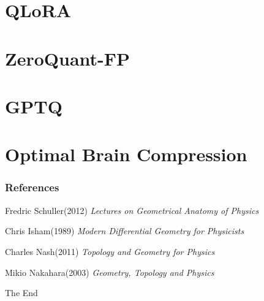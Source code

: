 \documentclass{beamer}
\theoremstyle{plain}
\theoremstyle{definition}
\theoremstyle{remark}
\numberwithin{equation}{section}
\numberwithin{figure}{section}
\numberwithin{theorem}{section}
\begin{document}
\section{QLoRA}
\section{ZeroQuant-FP}
\section{GPTQ}
\section{Optimal Brain Compression}



\begin{frame}
\frametitle{References}
\footnotesize{
\begin{thebibliography}{99} %
  Fredric Schuller(2012)
\textit{Lectures on Geometrical Anatomy of Physics}

 Chris Isham(1989)
\textit{ Modern Differential Geometry for Physicists}

 Charles Nash(2011)
\textit{ Topology and Geometry for Physics }

 Mikio Nakahara(2003)
\textit{ Geometry, Topology and Physics}

\end{thebibliography}
}
\end{frame}


\begin{frame}
\Huge{\centerline{The End}}
\end{frame}

\end{document}

